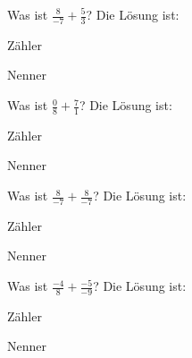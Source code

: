 \documentclass{ximera}
\begin{document}
\begin{shuffle}
\begin{question}
Was ist $\frac{8}{-7} + \frac{5}{3}$?
Die Lösung ist:
\begin{solution}
Zähler 
\end{solution}
\begin{solution}
Nenner 
\end{solution}
\end{question}


\begin{question}
Was ist $\frac{0}{8} + \frac{7}{1}$?
Die Lösung ist:
\begin{solution}
Zähler 
\end{solution}
\begin{solution}
Nenner 
\end{solution}
\end{question}


\begin{question}
Was ist $\frac{8}{-7} + \frac{8}{-7}$?
Die Lösung ist:
\begin{solution}
Zähler 
\end{solution}
\begin{solution}
Nenner 
\end{solution}
\end{question}


\begin{question}
Was ist $\frac{-4}{8} + \frac{-5}{-9}$?
Die Lösung ist:
\begin{solution}
Zähler 
\end{solution}
\begin{solution}
Nenner 
\end{solution}
\end{question}

\end{shuffle}
\end{document}
